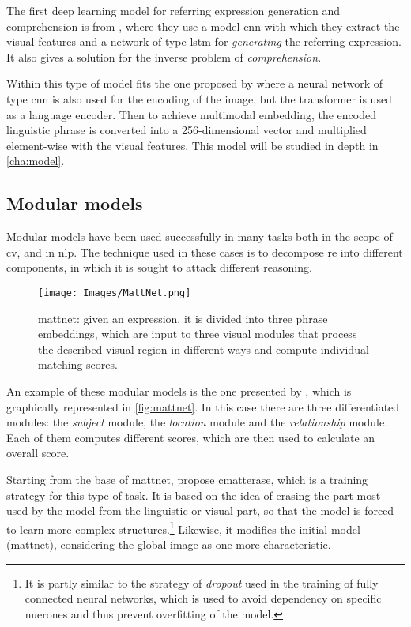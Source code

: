 The first deep learning model for referring expression generation and
comprehension is from , where they use a model \gls{cnn}
with which they extract the visual features and a network of type \gls{lstm}
for \emph{generating} the referring expression. It also gives a solution for the
inverse problem of \emph{comprehension}.

Within this type of model fits the one proposed by 
where a neural network of type \gls{cnn} is also used for the encoding of the
image, but the transformer is used as a language encoder. Then to achieve
multimodal embedding, the encoded linguistic phrase is converted into a
256-dimensional vector and multiplied element-wise with the visual
features. This model will be studied in depth in \vref{cha:model}.

\subsection{Modular models}\label{sec:modular}
Modular models have been used successfully in many tasks both in the scope of
\gls{cv}, and in \gls{nlp}. The technique used in these cases is to decompose
\gls{re} into different components, in which it is sought to attack different
reasoning.

\begin{figure}[htb]
  \centering
  \texttt{[image: Images/MattNet.png]}
  \caption[\acl*{mattnet}]{\gls{mattnet}: given an expression, it is divided
    into three phrase embeddings, which are input to three visual modules that
    process the described visual region in different ways and compute
    individual matching scores.}
  \label{fig:mattnet}
\end{figure}

An example of these modular models is the one presented by ,
which is graphically represented in \vref{fig:mattnet}. In this case there are
three differentiated modules: the \emph{subject} module, the \emph{location}
module and the \emph{relationship} module. Each of them computes different
scores, which are then used to calculate an overall score.

Starting from the base of \gls{mattnet},
 propose
\gls{cmatterase}, which is a training strategy for this type of task. It is
based on the idea of erasing the part most used by the model from the
linguistic or visual part, so that the model is forced to learn more complex
structures.\footnote{It is partly similar to the strategy of \emph{dropout}
  used in the training of fully connected neural networks, which is used to
  avoid dependency on specific nuerones and thus prevent overfitting of the
  model.} Likewise, it modifies the initial model (\gls{mattnet}), considering
the global image as one more characteristic.

